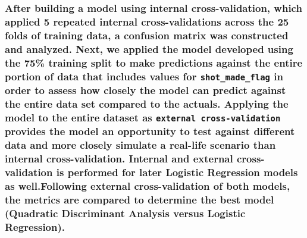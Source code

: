 \documentclass[american,]{article}
\begin{document}
{\subsubsection{\texorpdfstring{After building a model using internal cross-validation, which applied 5 repeated internal cross-validations across the 25 folds of training data, a confusion matrix was constructed and analyzed. Next, we applied the model developed using the 75\% training split to make predictions against the entire portion of data that includes values for \texttt{shot\_made\_flag} in order to assess how closely the model can predict against the entire data set compared to the actuals. Applying the model to the entire dataset as \texttt{external\ cross-validation} provides the model an opportunity to test against different data and more closely simulate a real-life scenario than internal cross-validation. Internal and external cross-validation is performed for later Logistic Regression models as well.Following external cross-validation of both models, the metrics are compared to determine the best model (Quadratic Discriminant Analysis versus Logistic Regression).}{After building a model using internal cross-validation, which applied 5 repeated internal cross-validations across the 25 folds of training data, a confusion matrix was constructed and analyzed. Next, we applied the model developed using the 75\% training split to make predictions against the entire portion of data that includes values for shot\_made\_flag in order to assess how closely the model can predict against the entire data set compared to the actuals. Applying the model to the entire dataset as external cross-validation provides the model an opportunity to test against different data and more closely simulate a real-life scenario than internal cross-validation. Internal and external cross-validation is performed for later Logistic Regression models as well.Following external cross-validation of both models, the metrics are compared to determine the best model (Quadratic Discriminant Analysis versus Logistic Regression).}}\label{after-building-a-model-using-internal-cross-validation-which-applied-5-repeated-internal-cross-validations-across-the-25-folds-of-training-data-a-confusion-matrix-was-constructed-and-analyzed.-next-we-applied-the-model-developed-using-the-75-training-split-to-make-predictions-against-the-entire-portion-of-data-that-includes-values-for-shot_made_flag-in-order-to-assess-how-closely-the-model-can-predict-against-the-entire-data-set-compared-to-the-actuals.-applying-the-model-to-the-entire-dataset-as-external-cross-validation-provides-the-model-an-opportunity-to-test-against-different-data-and-more-closely-simulate-a-real-life-scenario-than-internal-cross-validation.-internal-and-external-cross-validation-is-performed-for-later-logistic-regression-models-as-well.following-external-cross-validation-of-both-models-the-metrics-are-compared-to-determine-the-best-model-quadratic-discriminant-analysis-versus-logistic-regression.}}
\end{document}
